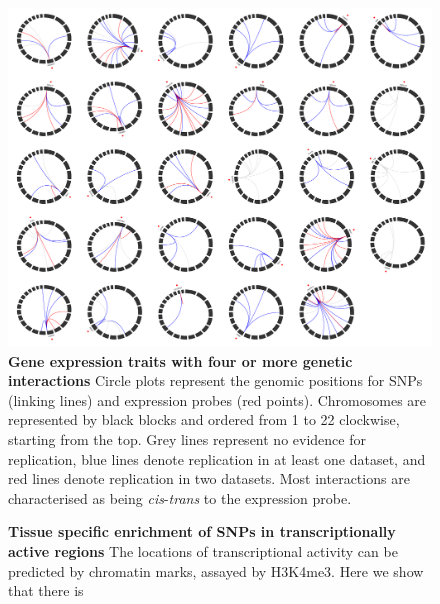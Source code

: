 \documentclass{article}
\begin{document}
\begin{figure}
	\includegraphics[width=5in]{circles_replication2}
	\caption{\textbf{Gene expression traits with four or more genetic interactions} Circle plots represent the genomic positions for SNPs (linking lines) and expression probes (red points). Chromosomes are represented by black blocks and ordered from 1 to 22 clockwise, starting from the top. Grey lines represent no evidence for replication, blue lines denote replication in at least one dataset, and red lines denote replication in two datasets. Most interactions are characterised as being \emph{cis}-\emph{trans} to the expression probe.}
	\label{fig:circleplots}
\end{figure}
\clearpage

\begin{figure}
	\caption{\textbf{Tissue specific enrichment of SNPs in transcriptionally active regions} The locations of transcriptional activity can be predicted by chromatin marks, assayed by H3K4me3. Here we show that there is }
	\label{fig:h3k4me3}
\end{figure}
\clearpage
\end{document}
